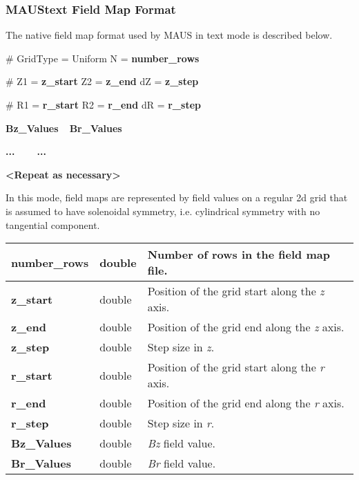 \subsubsection{MAUStext Field Map Format}
The native field map format used by MAUS in text mode is described below.

{\ttfamily
\# GridType = Uniform N = \textbf{number\_rows}}

{\ttfamily
\# Z1 = \textbf{z\_start} Z2 = \textbf{z\_end} dZ = \textbf{z\_step}}

{\ttfamily
\# R1 = \textbf{r\_start} R2 = \textbf{r\_end} dR = \textbf{r\_step}}

{\ttfamily\bfseries
Bz\_Values\ \ Br\_Values}

{\ttfamily\bfseries
...\ \ \ \ ...}

{\ttfamily\bfseries
{\textless}Repeat as necessary{\textgreater}}

In this mode, field maps are represented by field values on a regular 2d grid that is assumed to have solenoidal
symmetry, i.e. cylindrical symmetry with no tangential component.

\begin{center}
\tabletail{}
\tablelasttail{}
\begin{supertabular}{|m{3.665cm}|m{2.305cm}|m{11.025001cm}|}
\hline
{\ttfamily\bfseries number\_rows} &
double &
Number of rows in the field map file.\\\hline
{\ttfamily\bfseries z\_start} &
double &
Position of the grid start along the \textit{z} axis.\\\hline
{\ttfamily\bfseries z\_end} &
double &
Position of the grid end along the \textit{z} axis.\\\hline
{\ttfamily\bfseries z\_step} &
double &
Step size in \textit{z}.\\\hline
{\ttfamily\bfseries r\_start} &
double &
Position of the grid start along the \textit{r} axis.\\\hline
{\ttfamily\bfseries r\_end} &
double &
Position of the grid end along the \textit{r} axis.\\\hline
{\ttfamily\bfseries r\_step} &
double &
Step size in \textit{r}.\\\hline
{\ttfamily\bfseries Bz\_Values} &
double &
\textit{Bz} field value.\\\hline
{\ttfamily\bfseries Br\_Values} &
double &
\textit{Br} field value.\\\hline
\end{supertabular}
\end{center}
